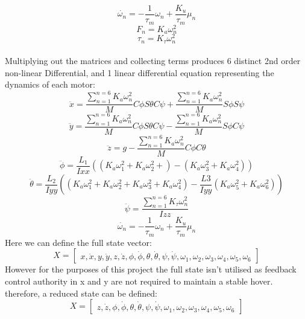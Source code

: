 \documentclass[12pt,a4paper,twoside]{report}
\begin{document}
			\begin{equation} 
				\dot{\omega_n} = -\frac{1}{\tau_m}\omega_n	 + \frac{K_u}{\tau_m}\mu_n
			\end{equation}
			\begin{equation} 
				F_n = K_a \omega_n^2
			\end{equation}
			\begin{equation} 
				\tau_n = K_\tau \omega_n^2
			\end{equation}
			\\
			Multiplying out the matrices and collecting terms produces 6 distinct 2nd order non-linear Differential, and 1 linear differential equation representing the dynamics of each motor:
			\\
			\begin{equation}
				\ddot{x} = \frac{\sum_{n=1}^{n=6}K_a \omega_n^2}{M}C\phi S\theta C\psi  + \frac{\sum_{n=1}^{n=6}K_a \omega_n^2}{M}S\phi S\psi
			\end{equation}
			\begin{equation}
				\ddot{y} = \frac{\sum_{n=1}^{n=6}K_a \omega_n^2}{M}C\phi S\theta C\psi  - \frac{\sum_{n=1}^{n=6}K_a \omega_n^2}{M}S\phi C\psi
			\end{equation}
			\begin{equation}
				\ddot{z} = g - \frac{\sum_{n=1}^{n=6}K_a \omega_n^2}{M}C\phi C\theta
			\end{equation}
			\begin{equation}
				\ddot{\phi} = \frac{L_1}{Ixx} ((K_a \omega_1^2+K_a \omega_2^2 +) - (K_a \omega_3^2+K_a \omega_4^2))
			\end{equation}
			\begin{equation}
				\ddot{\theta} = \frac{L_2}{Iyy} ((K_a \omega_1^2+K_a \omega_2^2+K_a \omega_3^2+K_a \omega_4^2) - \frac{L3}{Iyy} (K_a \omega_5^2+K_a \omega_6^2))
			\end{equation}
			\begin{equation}
				\ddot{\psi} = \frac{\sum_{n = 1}^{n = 6}K_\tau \omega_n^2}{Izz}
			\end{equation}
			\begin{equation}
				\dot{\omega_n} = -\frac{1}{\tau_m}\omega_n	 + \frac{K_u}{\tau_m}\mu_n
			\end{equation}
			Here we can define the full state vector:
			$$
				X =
				\begin{bmatrix}
					x,\dot{x},y,\dot{y},z,\dot{z},\phi,\dot{\phi},\theta,\dot{\theta},\psi,\dot{\psi},\omega_1,\omega_2,\omega_3,\omega_4,\omega_5,\omega_6
				\end{bmatrix}
			$$
			However for the purposes of this project the full state isn't utilised as feedback control authority in x and y are not required to maintain a stable hover. therefore, a reduced state can be defined: 
			$$
				X =
				\begin{bmatrix}
				z,\dot{z},\phi,\dot{\phi},\theta,\dot{\theta},\psi,\dot{\psi},\omega_1,\omega_2,\omega_3,\omega_4,\omega_5,\omega_6
				\end{bmatrix}
			$$
				
\end{document}
